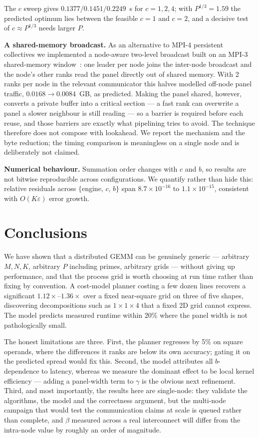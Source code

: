 \documentclass[conference,10pt]{IEEEtran}
\begin{document}
The $c$ sweep gives $0.1377/0.1451/0.2249$~s for $c{=}1,2,4$; with
$P^{1/3}{=}1.59$ the predicted optimum lies between the feasible $c{=}1$ and
$c{=}2$, and a decisive test of $c \approx P^{1/3}$ needs larger $P$.

\textbf{A shared-memory broadcast.} As an alternative to MPI-4 persistent
collectives we implemented a node-aware two-level broadcast
built on an MPI-3 shared-memory window~\cite{hoefler2013}: one leader per node
joins the inter-node broadcast and the node's other ranks read the panel
directly out of shared memory. With 2 ranks per node in the relevant
communicator this halves modelled off-node panel traffic, $0.0168 \to
0.0084$~GB, as predicted. Making the panel shared, however, converts a private
buffer into a critical section --- a fast rank can overwrite a panel a slower
neighbour is still reading --- so a barrier is required before each reuse, and
those barriers are exactly what pipelining tries to avoid. The technique
therefore does not compose with lookahead. We report the mechanism and the byte
reduction; the timing comparison is meaningless on a single node and is
deliberately not claimed.

\textbf{Numerical behaviour.} Summation order changes with $c$ and $b$, so
results are not bitwise reproducible across configurations. We quantify rather
than hide this: relative residuals across
$\{$engine, $c$, $b\}$ span $8.7\times10^{-16}$ to $1.1\times10^{-15}$,
consistent with $O(K\varepsilon)$ error growth.

\section{Conclusions}
\label{sec:concl}

We have shown that a distributed GEMM can be genuinely generic --- arbitrary
$M,N,K$, arbitrary $P$ including primes, arbitrary grids --- without giving up
performance, and that the process grid is worth choosing at run time rather
than fixing by convention. A cost-model planner costing a few dozen lines
recovers a significant $1.12\times$--$1.36\times$ over a fixed near-square grid
on three of five shapes, discovering decompositions such as
$1\!\times\!1\!\times\!4$ that a fixed 2D grid cannot express. The model predicts measured runtime within 20\%
where the panel width is not pathologically small.

The honest limitations are three. First, the planner regresses by 5\% on
square operands, where the differences it ranks are below its own accuracy;
gating it on the predicted spread would fix this. Second, the model attributes
all $b$-dependence to latency, whereas we measure the dominant effect to be
local kernel efficiency --- adding a panel-width term to $\gamma$ is the
obvious next refinement. Third, and most importantly, the results here are
single-node: they validate the algorithms, the model and the correctness
argument, but the multi-node campaign that would test the communication claims
at scale is queued rather than complete, and $\beta$ measured across a real
interconnect will differ from the intra-node value by roughly an order of
magnitude.
\end{document}
